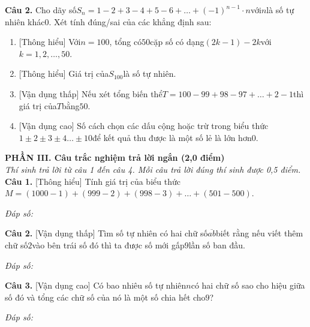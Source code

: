 \documentclass[11pt,a4paper]{article}
\begin{document}
\noindent\textbf{Câu 2.} Cho dãy số$S_n = 1 - 2 + 3 - 4 + 5 - 6 + \dots + (-1)^{n-1} \cdot n$với$n$là số tự nhiên khác$0$. Xét tính đúng/sai của các khẳng định sau:\par\vspace{2pt}
\begin{enumerate}[label=\textbf{\alph*)}, leftmargin=1.2cm, itemsep=2pt, topsep=2pt]
  \item \textnormal{[Thông hiểu]} Với$n = 100$, tổng có$50$cặp số có dạng$(2k - 1) - 2k$với$k = 1, 2, \dots, 50$.
  \item \textnormal{[Thông hiểu]} Giá trị của$S_{100}$là số tự nhiên.
  \item \textnormal{[Vận dụng thấp]} Nếu xét tổng biến thể$T = 100 - 99 + 98 - 97 + \dots + 2 - 1$thì giá trị của$T$bằng$50$.
  \item \textnormal{[Vận dụng cao]} Số cách chọn các dấu cộng hoặc trừ trong biểu thức$1 \pm 2 \pm 3 \pm 4 \dots \pm 10$để kết quả thu được là một số lẻ là lớn hơn$0$.
\end{enumerate}
\vspace{6pt}


\vspace{6pt}
\noindent
\textbf{\large PHẦN III. Câu trắc nghiệm trả lời ngắn (2,0 điểm)}\\
\textit{\small Thí sinh trả lời từ câu 1 đến câu 4. Mỗi câu trả lời đúng thí sinh được 0,5 điểm.}
\vspace{6pt}
\noindent\textbf{Câu 1.} [Thông hiểu] Tính giá trị của biểu thức$M = (1000 - 1) + (999 - 2) + (998 - 3) + \dots + (501 - 500)$.\par\vspace{2pt}
\noindent\textit{Đáp số:} \dotfill\par\vspace{6pt}

\noindent\textbf{Câu 2.} [Vận dụng thấp] Tìm số tự nhiên có hai chữ số$\overline{ab}$biết rằng nếu viết thêm chữ số$2$vào bên trái số đó thì ta được số mới gấp$9$lần số ban đầu.\par\vspace{2pt}
\noindent\textit{Đáp số:} \dotfill\par\vspace{6pt}

\noindent\textbf{Câu 3.} [Vận dụng cao] Có bao nhiêu số tự nhiên$n$có hai chữ số sao cho hiệu giữa số đó và tổng các chữ số của nó là một số chia hết cho$9$?\par\vspace{2pt}
\noindent\textit{Đáp số:} \dotfill\par\vspace{6pt}
\end{document}
